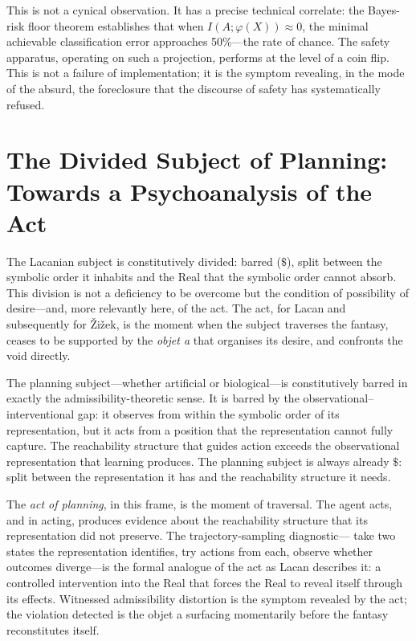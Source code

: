 \documentclass[10pt,a4paper]{article}
\begin{document}
This is not a cynical observation. It has a precise technical correlate: the
Bayes-risk floor theorem establishes that when $I(A;\varphi(X)) \approx 0$,
the minimal achievable classification error approaches 50\%---the rate of
chance. The safety apparatus, operating on such a projection, performs at
the level of a coin flip. This is not a failure of implementation; it is the
symptom revealing, in the mode of the absurd, the foreclosure that the
discourse of safety has systematically refused.

\section{The Divided Subject of Planning:\\
Towards a Psychoanalysis of the Act}

The Lacanian subject is constitutively divided: barred ($\$$), split between the
symbolic order it inhabits and the Real that the symbolic order cannot absorb.
This division is not a deficiency to be overcome but the condition of possibility
of desire---and, more relevantly here, of the act. The act, for Lacan and
subsequently for Žižek, is the moment when the subject traverses the fantasy,
ceases to be supported by the \emph{objet a} that organises its desire, and
confronts the void directly.

The planning subject---whether artificial or biological---is constitutively
barred in exactly the admissibility-theoretic sense. It is barred by the
observational--interventional gap: it observes from within the symbolic order
of its representation, but it acts from a position that the representation
cannot fully capture. The reachability structure that guides action exceeds
the observational representation that learning produces. The planning subject
is always already $\$$: split between the representation it has and the
reachability structure it needs.

The \emph{act of planning}, in this frame, is the moment of traversal. The
agent acts, and in acting, produces evidence about the reachability structure
that its representation did not preserve. The trajectory-sampling diagnostic---
take two states the representation identifies, try actions from each,
observe whether outcomes diverge---is the formal analogue of the act as Lacan
describes it: a controlled intervention into the Real that forces the Real to
reveal itself through its effects. Witnessed admissibility distortion is the
symptom revealed by the act; the violation detected is the objet a surfacing
momentarily before the fantasy reconstitutes itself.
\end{document}
